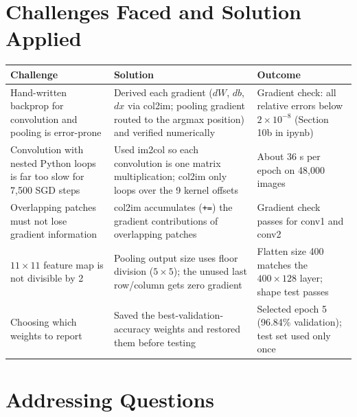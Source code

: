 \documentclass[11pt,a4paper]{article}
\newcommand{\code}[1]{\texttt{#1}}
\begin{document}
\section{Challenges Faced and Solution Applied}
\begin{table}[H]
\centering
\small
\begin{tabularx}{\linewidth}{@{}>{\raggedright\arraybackslash}p{3.6cm} X >{\raggedright\arraybackslash}p{3.8cm}@{}}
\toprule
\textbf{Challenge} & \textbf{Solution} & \textbf{Outcome} \\
\midrule
Hand-written backprop for convolution and pooling is error-prone &
Derived each gradient ($dW$, $db$, $dx$ via col2im; pooling gradient routed to the argmax position) and verified numerically &
Gradient check: all relative errors below $2\times10^{-8}$ (Section 10b in ipynb) \\
\addlinespace
Convolution with nested Python loops is far too slow for 7{,}500 SGD steps &
Used im2col so each convolution is one matrix multiplication; col2im only loops over the 9 kernel offsets &
About 36 s per epoch on 48{,}000 images \\
\addlinespace
Overlapping patches must not lose gradient information &
col2im accumulates (\code{+=}) the gradient contributions of overlapping patches &
Gradient check passes for conv1 and conv2 \\
\addlinespace
$11{\times}11$ feature map is not divisible by 2 &
Pooling output size uses floor division ($5{\times}5$); the unused last row/column gets zero gradient &
Flatten size 400 matches the $400{\times}128$ layer; shape test passes \\

\addlinespace
Choosing which weights to report &
Saved the best-validation-accuracy weights and restored them before testing &
Selected epoch 5 (96.84\% validation); test set used only once \\
\bottomrule
\end{tabularx}
\end{table}

\section{Addressing Questions}
\end{document}
